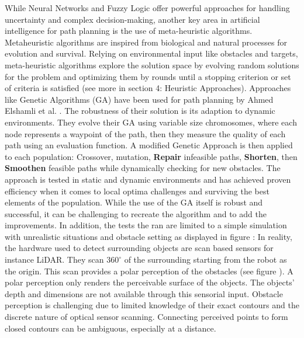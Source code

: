 While Neural Networks and Fuzzy Logic offer powerful approaches for handling uncertainty and complex decision-making, 
another key area in artificial intelligence for path planning is the use of meta-heuristic algorithms.
Metaheuristic algorithms are inspired from biological and natural processes for evolution and survival. 
Relying on environmental input like obstacles and targets, meta-heuristic algorithms explore the solution
space by evolving random solutions for the problem and optimizing them by rounds until a stopping criterion or set
of criteria is satisfied (see more in section 4: Heuristic Approaches).
Approaches like Genetic Algorithms (GA) have been used for path planning by Ahmed Elshamli et al. \cite{R17}. The robustness of their 
solution is its adaption to dynamic environments. They evolve their GA using variable size chromosomes, where each node 
represents a waypoint of the path, then they measure the quality of each path using an evaluation function. A modified Genetic Approach is then 
applied to each population: Crossover, mutation, \textbf{Repair} infeasible paths, \textbf{Shorten}, then \textbf{Smoothen} 
feasible paths while dynamically checking for new obstacles.
The approach is tested in static and dynamic environments and has achieved proven efficiency when it comes 
to local optima challenges and surviving the best elements of the population. While the use of the GA itself is robust
and successful, it can be challenging to recreate the algorithm and to add the improvements. In addition, the tests
the ran are limited to a simple simulation with unrealistic situations and obstacle setting as displayed in 
figure : In reality, the hardware used to detect surrounding objects are scan based sensors
for instance LiDAR. They scan \(360^{\circ}\) of the surrounding starting from the robot as the origin.
This scan provides a polar perception of the obstacles (see figure ). 
A polar perception only renders the perceivable surface of the objects.
The objects' depth and dimensions are not available through this sensorial input.
Obstacle perception is challenging due to limited knowledge of their exact contours and the 
discrete nature of optical sensor scanning. Connecting perceived points to form closed contours can 
be ambiguous, especially at a distance.

